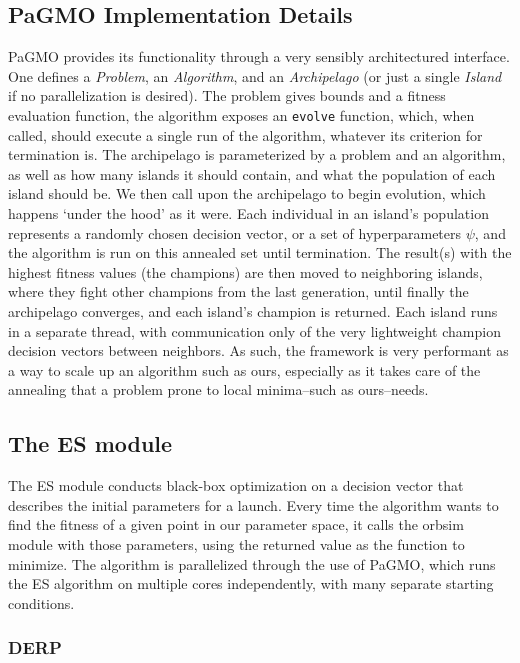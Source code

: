 \subsection{PaGMO Implementation Details}

PaGMO provides its functionality through a very sensibly architectured interface. One defines a \emph{Problem}, an \emph{Algorithm}, and an \emph{Archipelago} (or just a single \emph{Island} if no parallelization is desired). The problem gives bounds and a fitness evaluation function, the algorithm exposes an \texttt{evolve} function, which, when called, should execute a single run of the algorithm, whatever its criterion for termination is. The archipelago is parameterized by a problem and an algorithm, as well as how many islands it should contain, and what the population of each island should be. We then call upon the archipelago to begin evolution, which happens `under the hood' as it were. Each individual in an island's population represents a randomly chosen decision vector, or a set of hyperparameters \(\psi\), and the algorithm is run on this annealed set until termination. The result(s) with the highest fitness values (the champions) are then moved to neighboring islands, where they fight other champions from the last generation, until finally the archipelago converges, and each island's champion is returned. Each island runs in a separate thread, with communication only of the very lightweight champion decision vectors between neighbors. As such, the framework is very performant as a way to scale up an algorithm such as ours, especially as it takes care of the annealing that a problem prone to local minima--such as ours--needs.

\subsection{The ES module}

The ES module conducts black-box optimization on a decision vector that describes the initial parameters for a launch. Every time the algorithm wants to find the fitness of a given point in our parameter space, it calls the orbsim module with those parameters, using the returned value as the function to minimize. The algorithm is parallelized through the use of PaGMO, which runs the ES algorithm on multiple cores independently, with many separate starting conditions.

\subsubsection{DERP}

